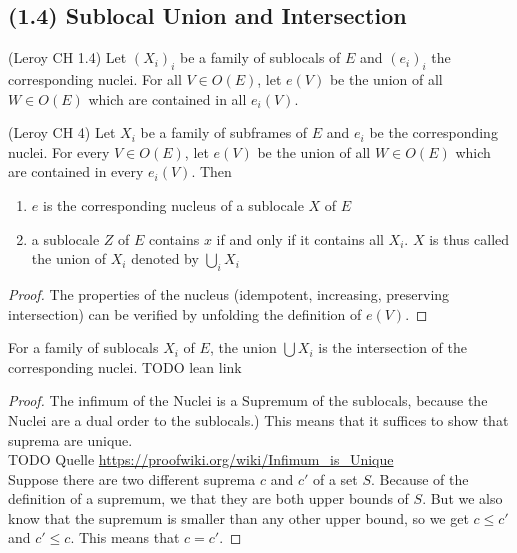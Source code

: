 \subsection{(1.4) Sublocal Union and Intersection}

\begin{definition}
(Leroy CH 1.4)
    \label{def:sublocal_union}
    \leanok
    Let $(X_i)_i$ be a family of sublocals of $E$ and $(e_i)_i$ the corresponding nuclei.
    For all $V \in O(E)$, let $e(V)$ be the union of all $W \in O(E)$ which are contained in all $e_i(V)$.
\end{definition}

\begin{lemma}
(Leroy CH 4)
    \label{lem:sublocal_union}
    \leanok
    Let $X_i$ be a family of subframes of $E$ and $e_i$ be the corresponding nuclei. For every $V \in O(E)$, let
    $e(V)$ be the union of all $W \in O(E)$ which are contained in every $e_i(V)$. Then \\
    \begin{enumerate}
        \item $e$ is the corresponding nucleus of a sublocale $X$ of $E$
        \item a sublocale $Z$ of $E$ contains $x$ if and only if it contains all $X_i$. $X$ is thus called the union of
        $X_i$ denoted by $\bigcup_i X_i$
    \end{enumerate}
\end{lemma}
\begin{proof}
    The properties of the nucleus (idempotent, increasing, preserving intersection) can be verified by unfolding the
    definition of $e(V)$.
    \leanok
\end{proof}

\begin{lemma}
    \label{lem:sublocal_union_nucleus_intersection}
    \leanok
    For a family of sublocals $X_i$ of $E$, the union $\bigcup X_i$ is the intersection of the corresponding nuclei.
    TODO lean link
\end{lemma}
\begin{proof}
    The infimum of the Nuclei is a Supremum of the sublocals, because the Nuclei are a dual order to the sublocals.)
    This means that it suffices to show that suprema are unique. \\
    TODO Quelle \url{https://proofwiki.org/wiki/Infimum_is_Unique} \\
    Suppose there are two different suprema $c$ and $c'$ of a set $S$. Because of the definition of a supremum, we
    that they are both upper bounds of $S$. But we also know that the supremum is smaller than any other upper bound, so
    we get $c \le c'$ and $c' \le c$. This means that $c = c'$.
    \leanok

\end{proof}


